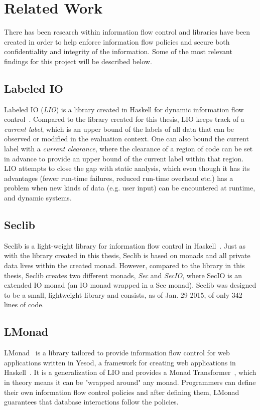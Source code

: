 \section{Related Work}
\label{chapter:related}
There has been research within information flow control and libraries have been created in order to help enforce information flow policies and secure both confidentiality and integrity of the information. Some of the most relevant findings for this project will be described below.
\subsection{Labeled IO}
Labeled IO (\emph{LIO}) is a library created in Haskell for dynamic information flow control~\cite{lio-2011}. Compared to the library created for this thesis, LIO keeps track of a \emph{current label}, which is an upper bound of the labels of all data that can be observed or modified in the evaluation context. One can also bound the current label with a \emph{current clearance}, where the clearance of a region of code can be set in advance to provide an upper bound of the current label within that region. LIO attempts to close the gap with static analysis, which even though it has its advantages (fewer run-time failures, reduced run-time overhead etc.) has a problem when new kinds of data (e.g. user input) can be encountered at runtime, and dynamic systems.
\subsection{Seclib}
Seclib is a light-weight library for information flow control in Haskell~\cite{seclib, seclib_git}. Just as with the library created in this thesis, Seclib is based on monads and all private data lives within the created monad. However, compared to the library in this thesis, Seclib creates two different monads, \emph{Sec} and \emph{SecIO}, where SecIO is an extended IO monad (an IO monad wrapped in a Sec monad). Seclib was designed to be a small, lightweight library and consists, as of Jan. 29 2015, of only 342 lines of code.
\subsection{LMonad}
LMonad~\cite{lmonad} is a library tailored to provide information flow control for web applications written in Yesod, a framework for creating web applications in Haskell~\cite{yesod}. It is a generalization of LIO and provides a Monad Transformer~\cite{monad-transformer}, which in theory means it can be "wrapped around" any monad. Programmers can define their own information flow control policies and after defining them, LMonad guarantees that database interactions follow the policies.
